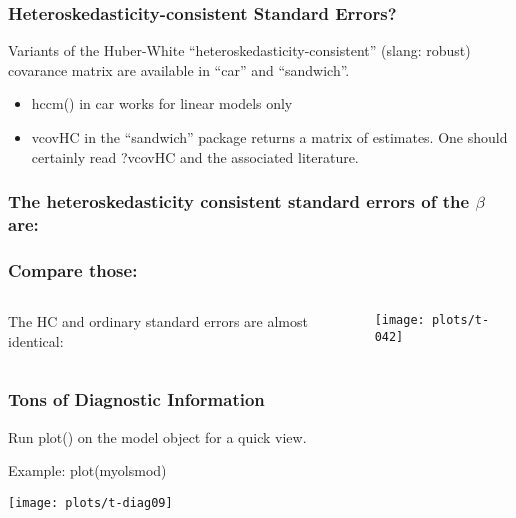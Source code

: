 \documentclass[10pt,english]{beamer}
\begin{document}
\begin{frame}[containsverbatim]
  \frametitle{Heteroskedasticity-consistent Standard Errors?}

  Variants of the
  Huber-White ``heteroskedasticity-consistent'' (slang: robust)
  covarance matrix are available in ``car'' and ``sandwich''.

  \begin{itemize}

    \item  hccm() in car works for linear models only

    \item vcovHC in the ``sandwich'' package returns a matrix of
      estimates. One should certainly read ?vcovHC and the associated literature.


\end{itemize}
\end{frame}


\begin{frame}[containsverbatim]
  \frametitle{The heteroskedasticity consistent standard errors of the $\hat{\beta}$  are:}


\end{frame}



\begin{frame}
  \frametitle{Compare those:}

\begin{columns}
  \column{3cm}

The HC and ordinary standard errors are almost identical:
  \column{8cm}

\texttt{[image: plots/t-042]}
\end{columns}

\end{frame}


\begin{frame}[containsverbatim]
\frametitle{Tons of Diagnostic Information}

  Run plot() on the model object for a quick view.

  Example: plot(myolsmod)




\end{frame}

\begin{frame}[plain]

\texttt{[image: plots/t-diag09]}

\end{frame}
\end{document}
